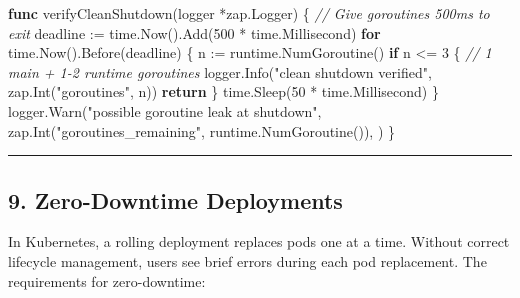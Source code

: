 \documentclass[
]{article}
\newenvironment{Shaded}{}{}
\newcommand{\CommentTok}[1]{\textcolor[rgb]{0.38,0.63,0.69}{\textit{#1}}}
\newcommand{\ControlFlowTok}[1]{\textcolor[rgb]{0.00,0.44,0.13}{\textbf{#1}}}
\newcommand{\DecValTok}[1]{\textcolor[rgb]{0.25,0.63,0.44}{#1}}
\newcommand{\KeywordTok}[1]{\textcolor[rgb]{0.00,0.44,0.13}{\textbf{#1}}}
\newcommand{\NormalTok}[1]{#1}
\newcommand{\OperatorTok}[1]{\textcolor[rgb]{0.40,0.40,0.40}{#1}}
\newcommand{\StringTok}[1]{\textcolor[rgb]{0.25,0.44,0.63}{#1}}
\begin{document}
\begin{Shaded}
\begin{Highlighting}[]
\KeywordTok{func}\NormalTok{ verifyCleanShutdown}\OperatorTok{(}\NormalTok{logger }\OperatorTok{*}\NormalTok{zap}\OperatorTok{.}\NormalTok{Logger}\OperatorTok{)} \OperatorTok{\{}
    \CommentTok{// Give goroutines 500ms to exit}
\NormalTok{    deadline }\OperatorTok{:=}\NormalTok{ time}\OperatorTok{.}\NormalTok{Now}\OperatorTok{().}\NormalTok{Add}\OperatorTok{(}\DecValTok{500} \OperatorTok{*}\NormalTok{ time}\OperatorTok{.}\NormalTok{Millisecond}\OperatorTok{)}
    \ControlFlowTok{for}\NormalTok{ time}\OperatorTok{.}\NormalTok{Now}\OperatorTok{().}\NormalTok{Before}\OperatorTok{(}\NormalTok{deadline}\OperatorTok{)} \OperatorTok{\{}
\NormalTok{        n }\OperatorTok{:=}\NormalTok{ runtime}\OperatorTok{.}\NormalTok{NumGoroutine}\OperatorTok{()}
        \ControlFlowTok{if}\NormalTok{ n }\OperatorTok{\textless{}=} \DecValTok{3} \OperatorTok{\{} \CommentTok{// 1 main + 1{-}2 runtime goroutines}
\NormalTok{            logger}\OperatorTok{.}\NormalTok{Info}\OperatorTok{(}\StringTok{"clean shutdown verified"}\OperatorTok{,}\NormalTok{ zap}\OperatorTok{.}\NormalTok{Int}\OperatorTok{(}\StringTok{"goroutines"}\OperatorTok{,}\NormalTok{ n}\OperatorTok{))}
            \ControlFlowTok{return}
        \OperatorTok{\}}
\NormalTok{        time}\OperatorTok{.}\NormalTok{Sleep}\OperatorTok{(}\DecValTok{50} \OperatorTok{*}\NormalTok{ time}\OperatorTok{.}\NormalTok{Millisecond}\OperatorTok{)}
    \OperatorTok{\}}
\NormalTok{    logger}\OperatorTok{.}\NormalTok{Warn}\OperatorTok{(}\StringTok{"possible goroutine leak at shutdown"}\OperatorTok{,}
\NormalTok{        zap}\OperatorTok{.}\NormalTok{Int}\OperatorTok{(}\StringTok{"goroutines\_remaining"}\OperatorTok{,}\NormalTok{ runtime}\OperatorTok{.}\NormalTok{NumGoroutine}\OperatorTok{()),}
    \OperatorTok{)}
\OperatorTok{\}}
\end{Highlighting}
\end{Shaded}

\begin{center}\rule{0.5\linewidth}{0.5pt}\end{center}

\hypertarget{zero-downtime-deployments}{%
\subsection{9. Zero-Downtime
Deployments}\label{zero-downtime-deployments}}

In Kubernetes, a rolling deployment replaces pods one at a time. Without
correct lifecycle management, users see brief errors during each pod
replacement. The requirements for zero-downtime:
\end{document}
